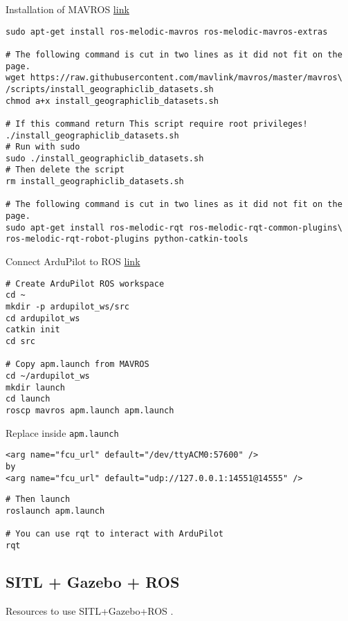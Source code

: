 Installation of MAVROS \href{http://ardupilot.org/dev/docs/ros-install.html#installing-mavros}{link}
\begin{verbatim}
sudo apt-get install ros-melodic-mavros ros-melodic-mavros-extras

# The following command is cut in two lines as it did not fit on the page.
wget https://raw.githubusercontent.com/mavlink/mavros/master/mavros\
/scripts/install_geographiclib_datasets.sh
chmod a+x install_geographiclib_datasets.sh

# If this command return This script require root privileges!
./install_geographiclib_datasets.sh
# Run with sudo
sudo ./install_geographiclib_datasets.sh
# Then delete the script
rm install_geographiclib_datasets.sh

# The following command is cut in two lines as it did not fit on the page.
sudo apt-get install ros-melodic-rqt ros-melodic-rqt-common-plugins\ ros-melodic-rqt-robot-plugins python-catkin-tools
            \end{verbatim}

Connect ArduPilot to ROS \href{http://ardupilot.org/dev/docs/ros-sitl.html}{link}
\begin{verbatim}
# Create ArduPilot ROS workspace
cd ~
mkdir -p ardupilot_ws/src
cd ardupilot_ws
catkin init
cd src

# Copy apm.launch from MAVROS
cd ~/ardupilot_ws
mkdir launch
cd launch
roscp mavros apm.launch apm.launch
            \end{verbatim}

Replace inside \texttt{apm.launch}
\begin{verbatim}
<arg name="fcu_url" default="/dev/ttyACM0:57600" />
by
<arg name="fcu_url" default="udp://127.0.0.1:14551@14555" />
            \end{verbatim}

\begin{verbatim}
# Then launch
roslaunch apm.launch

# You can use rqt to interact with ArduPilot
rqt
            \end{verbatim}

\subsection{SITL + Gazebo + ROS}

Resources to use SITL+Gazebo+ROS \cite{youtube_gazebo_ros} \cite{github_gazebo_ros}.



